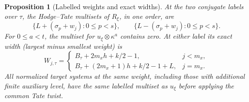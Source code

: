 \documentclass[a4paper,11pt]{article}
\newtheorem{proposition}{Proposition}[section]
\theoremstyle{definition}
\theoremstyle{remark}
\numberwithin{equation}{section}
\begin{document}
\begin{proposition}[Labelled weights and exact widths]
\leavevmode\label{prop:highwidth788}
At the two conjugate labels over \(\tau\), the Hodge--Tate
multisets of \(R_\xi\), in one order, are
\[
  \{L+(\sigma_p+w_j):0\le p<s\},\qquad
  \{L-(\sigma_p+w_j):0\le p<s\}.
\]
For \(0\le a<t\), the multiset for \(u_\xi\otimes\kappa^a\)
contains zero. At either label its exact width
(largest minus smallest weight) is
\[
 W_{j,\tau}=
 \begin{cases}
 B_\tau+2m_xh+k/2-1,&j<m_x,\\
 B_\tau+(2m_x+1)h+k/2-1+L,&j=m_x .
 \end{cases}
\]
All normalized target systems at the same weight, including
those with additional finite auxiliary level, have the same
labelled multiset as \(u_\xi\) before applying the common
Tate twist.
\end{proposition}
\end{document}
